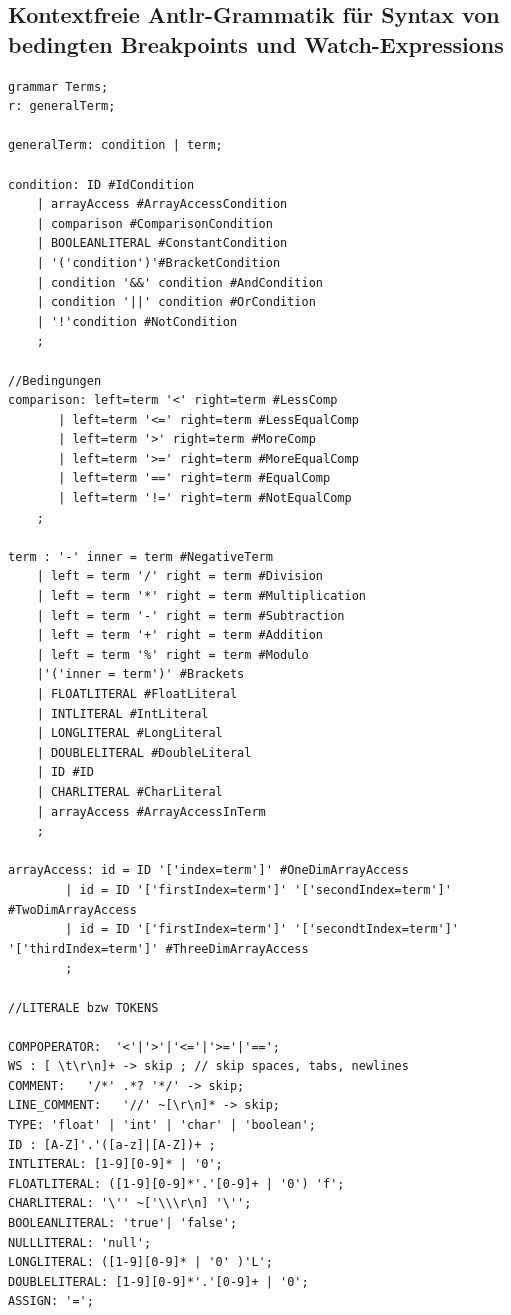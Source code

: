 \documentclass[parskip=full]{scrartcl}
\begin{document}
\subsection{Kontextfreie Antlr-Grammatik für Syntax von bedingten Breakpoints und Watch-Expressions}
\begin{verbatim}
grammar Terms;
r: generalTerm;

generalTerm: condition | term;

condition: ID #IdCondition
	| arrayAccess #ArrayAccessCondition
	| comparison #ComparisonCondition
	| BOOLEANLITERAL #ConstantCondition
	| '('condition')'#BracketCondition
	| condition '&&' condition #AndCondition
	| condition '||' condition #OrCondition
	| '!'condition #NotCondition
	;
	
//Bedingungen
comparison: left=term '<' right=term #LessComp
	   | left=term '<=' right=term #LessEqualComp
	   | left=term '>' right=term #MoreComp
	   | left=term '>=' right=term #MoreEqualComp
	   | left=term '==' right=term #EqualComp
	   | left=term '!=' right=term #NotEqualComp
	;

term : '-' inner = term #NegativeTerm
    | left = term '/' right = term #Division
	| left = term '*' right = term #Multiplication
	| left = term '-' right = term #Subtraction
	| left = term '+' right = term #Addition
	| left = term '%' right = term #Modulo
	|'('inner = term')' #Brackets
	| FLOATLITERAL #FloatLiteral
	| INTLITERAL #IntLiteral
	| LONGLITERAL #LongLiteral
	| DOUBLELITERAL #DoubleLiteral
	| ID #ID
	| CHARLITERAL #CharLiteral
	| arrayAccess #ArrayAccessInTerm
	;

arrayAccess: id = ID '['index=term']' #OneDimArrayAccess
		| id = ID '['firstIndex=term']' '['secondIndex=term']' #TwoDimArrayAccess
		| id = ID '['firstIndex=term']' '['secondtIndex=term']' '['thirdIndex=term']' #ThreeDimArrayAccess
		;

//LITERALE bzw TOKENS

COMPOPERATOR:  '<'|'>'|'<='|'>='|'==';
WS : [ \t\r\n]+ -> skip ; // skip spaces, tabs, newlines
COMMENT:   '/*' .*? '*/' -> skip;
LINE_COMMENT:   '//' ~[\r\n]* -> skip;
TYPE: 'float' | 'int' | 'char' | 'boolean';
ID : [A-Z]'.'([a-z]|[A-Z])+ ;
INTLITERAL: [1-9][0-9]* | '0';
FLOATLITERAL: ([1-9][0-9]*'.'[0-9]+ | '0') 'f';
CHARLITERAL: '\'' ~['\\\r\n] '\'';
BOOLEANLITERAL:	'true'|	'false';
NULLLITERAL: 'null';
LONGLITERAL: ([1-9][0-9]* | '0' )'L';
DOUBLELITERAL: [1-9][0-9]*'.'[0-9]+ | '0';
ASSIGN: '=';

\end{verbatim}
\end{document}
